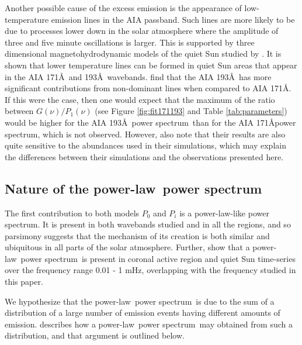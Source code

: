 \documentclass[onecolumn]{emulateapj}
\newcommand{\PS}{power spectrum}
\newcommand{\PL}{power-law}
\begin{document}
Another possible cause of the excess emission is the appearance of
low-temperature emission lines in the AIA passband.  Such lines are
more likely to be due to processes lower down in the solar atmosphere
where the amplitude of three and five minute oscillations is larger.
This is supported by three dimensional magnetohydrodynamic models of
the quiet Sun studied by \cite{2011ApJ...743...23M}.  It is shown that
lower temperature lines can be formed in quiet Sun areas that appear
in the AIA 171\AA\ and 193\AA\ wavebands. \cite{2011ApJ...743...23M}
find that the AIA 193\AA\ has more significant contributions from
non-dominant lines when compared to AIA 171\AA.  If this were the
case, then one would expect that the maximum of the ratio between
$G(\nu)/P_{1}(\nu)$ (see Figure \ref{fig:fit171193} and Table
\ref{tab:parameters}) would be higher for the AIA 193\AA\ \PS\ than
for the AIA 171\AA \PS, which is not observed.  However,
\cite{2011ApJ...743...23M} also note that their results are also quite
sensitive to the abundances used in their simulations, which may
explain the differences between their simulations and the observations
presented here.

\subsection{Nature of the \protect\PL\ \protect\PS}\label{ssec:nplps}
The first contribution to both models $P_{0}$ and $P_{i}$ is a
\PL-like \PS.  It is present in both wavebands studied and in all the
regions, and so parsimony suggests that the mechanism of its creation
is both similar and ubiquitous in all parts of the solar atmosphere.
Further, \cite{2014AA...563A...8A} show that a \PL\ \PS\ is present in
coronal active region and quiet Sun time-series over the frequency
range 0.01 - 1 mHz, overlapping with the frequency studied in this paper.

We hypothesize that the \PL\ \PS\ is due to the sum of a distribution
of a large number of emission events having different amounts of
emission. \cite{2011soca.book.....A} describes how a \PL\ \PS\ may
obtained from such a distribution, and that argument is outlined
below.
\end{document}
